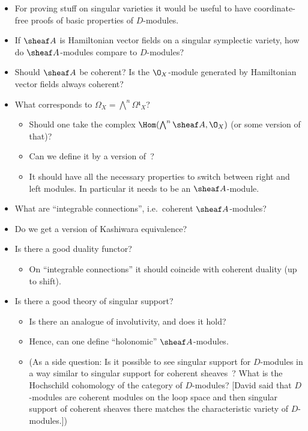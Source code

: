 \documentclass[english,no-theorem-numbers]{short-notes}
\begin{document}
\begin{itemize}
    \item For proving stuff on singular varieties it would be useful to have coordinate-free proofs of basic properties of $D$-modules.
    \item If $\sheaf A$ is Hamiltonian vector fields on a singular symplectic variety, how do $\sheaf A$-modules compare to $D$-modules?
    \item Should $\sheaf A$ be coherent? Is the $\O_X$-module generated by Hamiltonian vector fields always coherent?
    \item What corresponds to $Ω_X = \bigwedge^n Ω¹_X$?
        \begin{itemize}
            \item Should one take the complex $\Hom(\bigwedge^n \sheaf A, \O_X)$ (or some version of that)?
            \item Can we define it by a version of~\cite[Lemma~1.5.7]{HottaTakeuchiTanisaki:2008:DModulesPerverseSheavesRepresentationTheory}?
            \item It should have all the necessary properties to switch between right and left modules.
                In particular it needs to be an $\sheaf A$-module.
        \end{itemize}
    \item What are \enquote{integrable connections}, i.e.~coherent $\sheaf A$-modules?
    \item Do we get a version of Kashiwara equivalence?
    \item Is there a good duality functor?
        \begin{itemize}
            \item On \enquote{integrable connections} it should coincide with coherent duality (up to shift).
        \end{itemize}
    \item Is there a good theory of singular support?
        \begin{itemize}
            \item Is there an analogue of involutivity, and does it hold?
            \item Hence, can one define \enquote{holonomic} $\sheaf A$-modules.
            \item (As a side question: Is it possible to see singular support for $D$-modules in a way similar to singular support for coherent sheaves~\cite{ArinkinGaitsgory:arXiv:SingularSupport}? What is the Hochschild cohomology of the category of $D$-modules? [David said that $D$-modules are coherent modules on the loop space and then singular support of coherent sheaves there matches the characteristic variety of $D$-modules.])

\end{itemize}
\end{itemize}
\end{document}
